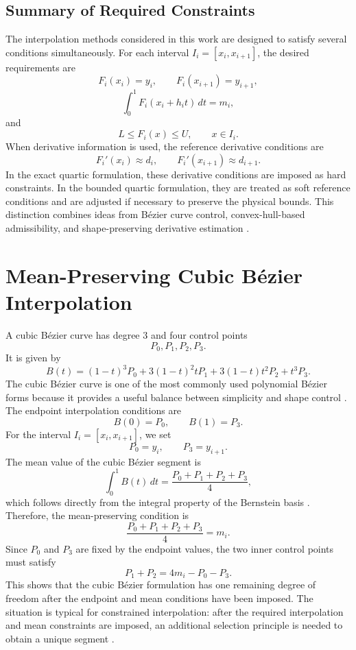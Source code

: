 \documentclass[12pt,a4paper]{article}
\begin{document}
\subsection{Summary of Required Constraints}

The interpolation methods considered in this work are designed to satisfy several conditions simultaneously. For each interval \(I_i=[x_i,x_{i+1}]\), the desired requirements are
\[
F_i(x_i)=y_i,
\qquad
F_i(x_{i+1})=y_{i+1},
\]
\[
\int_0^1 F_i(x_i+h_i t)\,dt=m_i,
\]
and
\[
L\leq F_i(x)\leq U,
\qquad x\in I_i.
\]
When derivative information is used, the reference derivative conditions are
\[
F_i'(x_i)\approx d_i,
\qquad
F_i'(x_{i+1})\approx d_{i+1}.
\]
In the exact quartic formulation, these derivative conditions are imposed as hard constraints. In the bounded quartic formulation, they are treated as soft reference conditions and are adjusted if necessary to preserve the physical bounds. This distinction combines ideas from B\'ezier curve control, convex-hull-based admissibility, and shape-preserving derivative estimation \cite{farin2002curves,piegl1997nurbs,fritsch1980monotone,fritsch1984monotone}.

\newpage
\section{Mean-Preserving Cubic B\'ezier Interpolation}

A cubic B\'ezier curve has degree \(3\) and four control points
\[
P_0,P_1,P_2,P_3.
\]
It is given by
\[
B(t)=(1-t)^3P_0+3(1-t)^2tP_1+3(1-t)t^2P_2+t^3P_3.
\]
The cubic B\'ezier curve is one of the most commonly used polynomial B\'ezier forms because it provides a useful balance between simplicity and shape control \cite{farin2002curves,piegl1997nurbs,pomaxBezierPrimer}. The endpoint interpolation conditions are
\[
B(0)=P_0,
\qquad
B(1)=P_3.
\]
For the interval \(I_i=[x_i,x_{i+1}]\), we set
\[
P_0=y_i,
\qquad
P_3=y_{i+1}.
\]
The mean value of the cubic B\'ezier segment is
\[
\int_0^1B(t)\,dt=
\frac{P_0+P_1+P_2+P_3}{4},
\]
which follows directly from the integral property of the Bernstein basis \cite{farin2002curves,aaltoBezier2013}. Therefore, the mean-preserving condition is
\[
\frac{P_0+P_1+P_2+P_3}{4}=m_i.
\]
Since \(P_0\) and \(P_3\) are fixed by the endpoint values, the two inner control points must satisfy
\[
P_1+P_2=4m_i-P_0-P_3.
\]
This shows that the cubic B\'ezier formulation has one remaining degree of freedom after the endpoint and mean conditions have been imposed. The situation is typical for constrained interpolation: after the required interpolation and mean constraints are imposed, an additional selection principle is needed to obtain a unique segment \cite{krylyk2013computational,deboor1978splines}.
\end{document}
